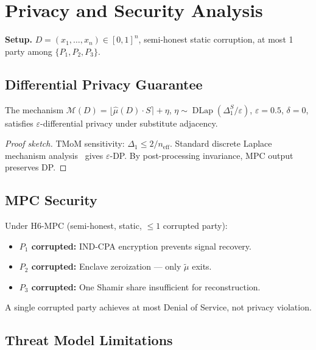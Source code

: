 \section{Privacy and Security Analysis}

\noindent\textbf{Setup.}
$D=(x_1,\ldots,x_n)\in[0,1]^n$,
semi-honest static corruption,
at most 1 party among $\{P_1,P_2,P_3\}$.

\subsection{Differential Privacy Guarantee}

\begin{theorem}
The mechanism $\mathcal{M}(D) =
\lfloor\hat{\mu}(D)\cdot S\rceil + \eta$,
$\eta\sim\operatorname{DLap}(\Delta_1^S/\varepsilon)$,
$\varepsilon=0.5$, $\delta=0$,
satisfies $\varepsilon$-differential privacy
under substitute adjacency.
\end{theorem}

\begin{proof}[Proof sketch]
TMoM sensitivity:
$\Delta_1 \leq 2/n_{\mathrm{eff}}$.
Standard discrete Laplace mechanism
analysis~\cite{DworkRoth2014} gives
$\varepsilon$-DP. By post-processing
invariance, MPC output preserves DP.
\end{proof}

\subsection{MPC Security}

Under H6-MPC (semi-honest, static,
$\leq 1$ corrupted party):

\begin{itemize}
\item \textbf{$P_1$ corrupted:}
IND-CPA encryption prevents signal recovery.
\item \textbf{$P_2$ corrupted:}
Enclave zeroization — only $\tilde{\mu}$ exits.
\item \textbf{$P_3$ corrupted:}
One Shamir share insufficient for reconstruction.
\end{itemize}

A single corrupted party achieves at most
Denial of Service, not privacy violation.

\subsection{Threat Model Limitations}

